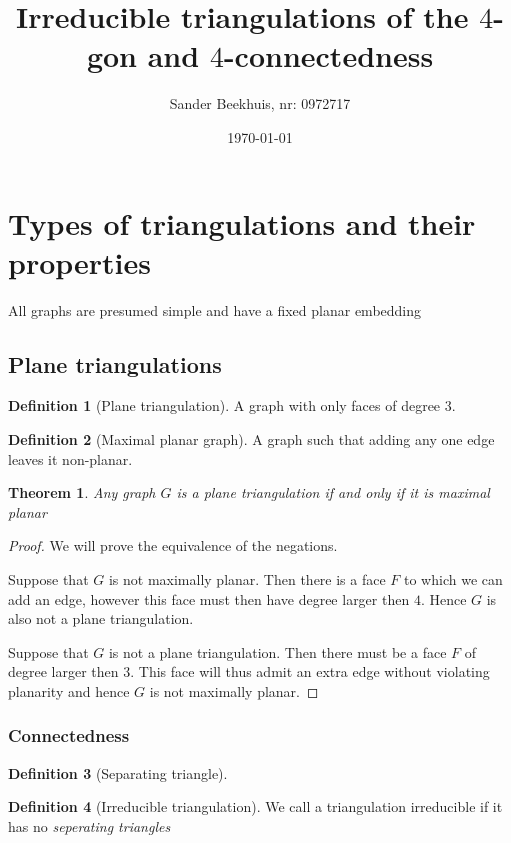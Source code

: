 \documentclass[a4paper]{article}
\title{Irreducible triangulations of the $4$-gon and $4$-connectedness }
\author{Sander Beekhuis, nr: 0972717}
\date{\today} %
\newtheorem{thrm}{Theorem}
\theoremstyle{definition}
\newtheorem*{defi}{Definition}
\newcommand{\ifftext}{if and only if }
\begin{document}
\maketitle

\section{Types of triangulations and their properties}

All graphs are presumed simple and have a fixed planar embedding

\subsection{Plane triangulations}

\begin{defi} [Plane triangulation]
A graph with only faces of degree $3$.
\end{defi}


\begin{defi} [Maximal planar graph]
A graph such that adding any one edge leaves it non-planar.
\end{defi}

\begin{thrm}
Any graph $G$ is a plane triangulation \ifftext it is maximal planar
\end{thrm}

\begin{proof}
We will prove the equivalence of the negations.

Suppose that $G$ is not maximally planar. Then there is a face $F$ to which we can add an edge, however this face must then have degree larger then $4$. Hence $G$ is also not a plane triangulation. 

Suppose that $G$ is not a plane triangulation. Then there must be a face $F$ of degree larger then $3$. This face will thus admit an extra edge without violating planarity and hence $G$ is not maximally planar.
\end{proof}

\subsubsection{Connectedness}

\begin{defi}[Separating triangle]
\end{defi}

\begin{defi}[Irreducible triangulation]
We call a triangulation irreducible if it has no \emph{seperating triangles}
\end{defi}
\end{document}
